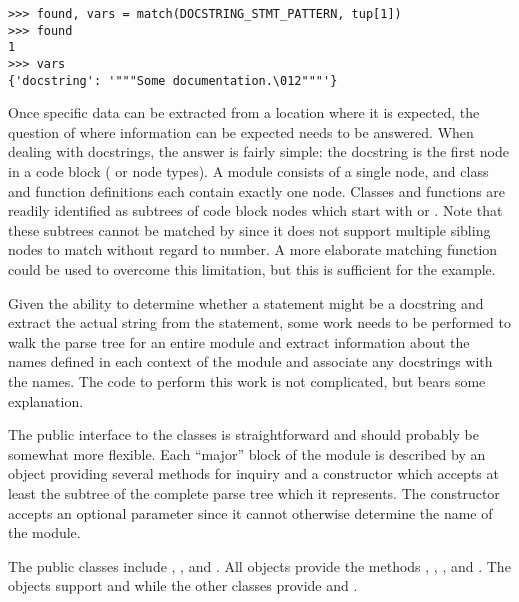 \begin{verbatim}
>>> found, vars = match(DOCSTRING_STMT_PATTERN, tup[1])
>>> found
1
>>> vars
{'docstring': '"""Some documentation.\012"""'}
\end{verbatim}

Once specific data can be extracted from a location where it is
expected, the question of where information can be expected
needs to be answered.  When dealing with docstrings, the answer is
fairly simple: the docstring is the first  node in a code
block ( or  node types).  A module
consists of a single  node, and class and function
definitions each contain exactly one  node.  Classes and
functions are readily identified as subtrees of code block nodes which
start with  or
.  Note that these subtrees
cannot be matched by  since it does not support multiple
sibling nodes to match without regard to number.  A more elaborate
matching function could be used to overcome this limitation, but this
is sufficient for the example.

Given the ability to determine whether a statement might be a
docstring and extract the actual string from the statement, some work
needs to be performed to walk the parse tree for an entire module and
extract information about the names defined in each context of the
module and associate any docstrings with the names.  The code to
perform this work is not complicated, but bears some explanation.

The public interface to the classes is straightforward and should
probably be somewhat more flexible.  Each ``major'' block of the
module is described by an object providing several methods for inquiry
and a constructor which accepts at least the subtree of the complete
parse tree which it represents.  The  constructor
accepts an optional  parameter since it cannot
otherwise determine the name of the module.

The public classes include , ,
and .  All objects provide the
methods , ,
, and .  The
 objects support  and
 while the other classes provide
 and .


